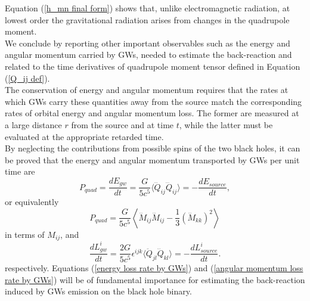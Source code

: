 \documentclass[12pt,twoside,openany]{book}
\begin{document}
Equation (\ref{h_mn final form}) shows that, unlike electromagnetic radiation, at lowest order the gravitational radiation arises from changes in the quadrupole moment.\\We conclude by reporting other important observables such as the energy and angular momentum carried by GWs, needed to estimate the back-reaction and related to the time derivatives of quadrupole moment tensor defined in Equation (\ref{Q_ij def}).\\The conservation of energy and angular momentum requires that the rates at which GWs carry these quantities away from the source match the corresponding rates of orbital energy and angular momentum loss. The former are measured at a large distance $r$ from the source and at time $t$, while the latter must be evaluated at the appropriate retarded time.\\By neglecting the contributions from possible spins of the two black holes, it can be proved that the energy and angular momentum transported by GWs per unit time are
\begin{equation}\label{energy loss rate by GWs}
    P_{quad}=\frac{dE_{gw}}{dt}=\frac{G}{5c^5}\langle\dddot{Q}_{ij}\dddot{Q}_{ij}\rangle=-\frac{dE_{source}}{dt},
\end{equation}
or equivalently
\begin{equation}\label{P_quad in terms of M_ij}
     P_{quad}=\frac{G}{5c^5}\left\langle\dddot{M}_{ij}\dddot{M}_{ij}-\frac{1}{3}(\dddot{M}_{kk})^2\right\rangle
\end{equation}
in terms of $M_{ij}$, and
\begin{equation}\label{angular momentum loss rate by GWs}
    \frac{dL^i_{gw}}{dt}=\frac{2G}{5c^5}\epsilon^{ijk}\langle\ddot{Q}_{jl}\dddot{Q}_{kl}\rangle=-\frac{dL^i_{source}}{dt}.
\end{equation}
respectively. Equations (\ref{energy loss rate by GWs}) and (\ref{angular momentum loss rate by GWs}) will be of fundamental importance for estimating the back-reaction induced by GWs emission on the black hole binary.
\end{document}
